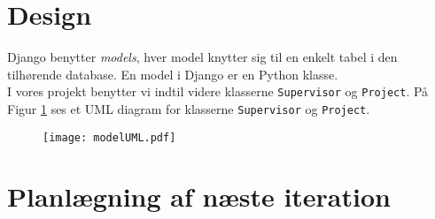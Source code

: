 \documentclass[11pt]{article}
\begin{document}
\section{Design}
Django benytter \textit{models}, hver model knytter sig til en enkelt tabel i den tilhørende database. En model i Django er en Python klasse. \\ I vores projekt benytter vi indtil videre klasserne \texttt{Supervisor} og \texttt{Project}. På Figur \ref{fig:modelUML} ses et UML diagram for klasserne \texttt{Supervisor} og \texttt{Project}. 

\begin{figure}
			\centering
			\texttt{[image: modelUML.pdf]}
			\caption{}
			\label{fig:modelUML}
	\end{figure}

\section{Planlægning af næste iteration}
\end{document}
